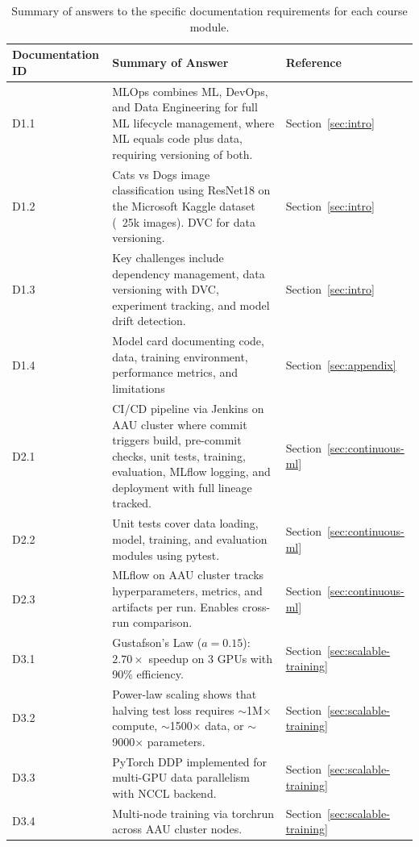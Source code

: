 \begin{table}[t] 
    \centering
    \caption{Summary of answers to the specific documentation requirements for each course module.}
    \label{tab:summary}
    \begin{tabularx}{\textwidth}{@{} l X l @{}} %
        \toprule
        \textbf{Documentation ID} & \textbf{Summary of Answer} & \textbf{Reference} \\
        \midrule
        D1.1  & MLOps combines ML, DevOps, and Data Engineering for full ML lifecycle management, where ML equals code plus data, requiring versioning of both. & Section~\ref{sec:intro} \\
        D1.2  & Cats vs Dogs image classification using ResNet18 on the Microsoft Kaggle dataset (~25k images). DVC for data versioning. & Section~\ref{sec:intro} \\
        D1.3  & Key challenges include dependency management, data versioning with DVC, experiment tracking, and model drift detection. & Section~\ref{sec:intro} \\
        D1.4  & Model card documenting code, data, training environment, performance metrics, and limitations & Section~\ref{sec:appendix} \\
        D2.1  & CI/CD pipeline via Jenkins on AAU cluster where commit triggers build, pre-commit checks, unit tests, training, evaluation, MLflow logging, and deployment with full lineage tracked. & Section~\ref{sec:continuous-ml} \\
        D2.2  & Unit tests cover data loading, model, training, and evaluation modules using pytest. & Section~\ref{sec:continuous-ml} \\
        D2.3  & MLflow on AAU cluster tracks hyperparameters, metrics, and artifacts per run. Enables cross-run comparison. & Section~\ref{sec:continuous-ml} \\
        D3.1  & Gustafson's Law ($a=0.15$): $2.70\times$ speedup on 3 GPUs with 90\% efficiency. & Section~\ref{sec:scalable-training} \\
        D3.2  & Power-law scaling shows that halving test loss requires $\sim$1M$\times$ compute, $\sim$1500$\times$ data, or $\sim$9000$\times$ parameters. & Section~\ref{sec:scalable-training} \\
        D3.3  & PyTorch DDP implemented for multi-GPU data parallelism with NCCL backend. & Section~\ref{sec:scalable-training} \\
        D3.4  & Multi-node training via torchrun across AAU cluster nodes. & Section~\ref{sec:scalable-training} \\

\end{tabularx}
\end{table}
